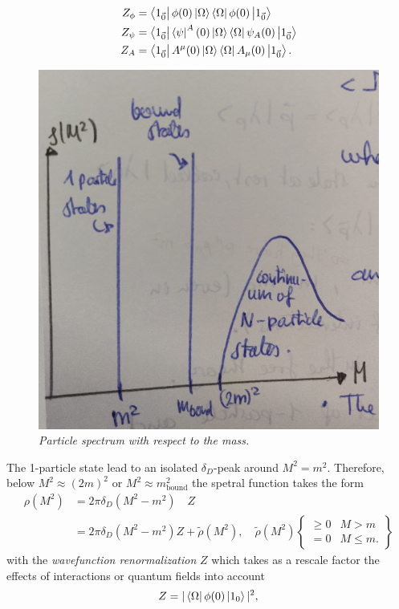 \begin{align}
	Z_\phi &= \bra{1_{\vec{0}}}\phi(0) \ket{\Omega}\bra{\Omega}\phi(0) \ket{1_{\vec{0}}}\\
	Z_\psi &= \bra{1_{\vec{0}}}\bra{\psi}^A(0)\ket{\Omega} \bra{\Omega}\psi_A(0) \ket{1_{\vec{0}}}\\
	Z_A &= \bra{1_{\vec{0}}} A^\mu(0) \ket{\Omega}\bra{\Omega} A_\mu(0) \ket{1_{\vec{0}}}.
\end{align}
\begin{figure}[h!]
	\centering
	\includegraphics[width=0.7\linewidth]{gfx/SpectrumInteractingTheoryMass}
	\caption{\itshape Particle spectrum with respect to the mass.}
	\label{fig:spectruminteractingtheorymass}
\end{figure}
The 1-particle state lead to an isolated $\delta_D$-peak around $M^2=m^2$. Therefore, below $M^2\approx(2m)^2$ or $M^2\approx m^2_{\mathrm{bound}}$ the spetral function takes the form
\begin{align}
	\rho(M^2) &= 2 \pi \delta_D(M^2-m^2) \quad Z \\
	&= 2 \pi \delta_D(M^2-m^2) Z+ \tilde{\rho}(M^2), \quad \tilde{\rho} (M^2) \left\{ \begin{array}{lr} \geq 0 & M>m \\
		=0 & M \leq m.
	\end{array}\right\}
\end{align}
with the \emph{wavefunction renormalization} $Z$ which takes as a rescale factor the effects of interactions or quantum fields into account
\begin{equation}
	Z=|\bra{\Omega}\phi(0)\ket{1_0}|^2,
\end{equation}
